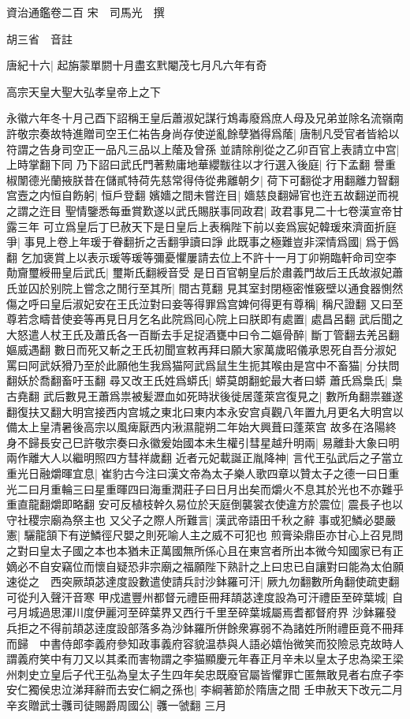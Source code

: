 資治通鑑卷二百
宋　司馬光　撰

胡三省　音註

唐紀十六|{
	起旃蒙單閼十月盡玄黓閹茂七月凡六年有奇}


高宗天皇大聖大弘孝皇帝上之下

永徽六年冬十月己酉下詔稱王皇后蕭淑妃謀行鴆毒廢爲庶人母及兄弟並除名流嶺南許敬宗奏故特進贈司空王仁祐告身尚存使逆亂餘孽猶得爲䕃|{
	唐制凡受官者皆給以符謂之告身司空正一品凡三品以上䕃及曾孫}
並請除削從之乙卯百官上表請立中宫|{
	上時掌翻下同}
乃下詔曰武氏門著勲庸地華纓黻往以才行選入後庭|{
	行下孟翻}
譽重椒闈德光蘭掖朕昔在儲貳特荷先慈常得侍從弗離朝夕|{
	荷下可翻從才用翻離力智翻}
宫壼之内恒自飭躬|{
	恒戶登翻}
嬪嬙之間未嘗迕目|{
	嬙慈良翻婦官也迕五故翻逆而視之謂之迕目}
聖情鑒悉每垂賞歎遂以武氏賜朕事同政君|{
	政君事見二十七卷漢宣帝甘露三年}
可立爲皇后丁巳赦天下是日皇后上表稱陛下前以妾爲宸妃韓瑗來濟面折庭爭|{
	事見上卷上年瑗于眷翻折之舌翻爭讀曰諍}
此既事之極難豈非深情爲國|{
	爲于僞翻}
乞加褒賞上以表示瑗等瑗等彌憂懼屢請去位上不許十一月丁卯朔臨軒命司空李勣齎璽綬冊皇后武氏|{
	璽斯氏翻綬音受}
是日百官朝皇后於肅義門故后王氏故淑妃蕭氏並囚於别院上嘗念之閒行至其所|{
	間古莧翻}
見其室封閉極密惟竅壁以通食器惻然傷之呼曰皇后淑妃安在王氏泣對曰妾等得罪爲宫婢何得更有尊稱|{
	稱尺證翻}
又曰至尊若念疇昔使妾等再見日月乞名此院爲囘心院上曰朕即有處置|{
	處昌呂翻}
武后聞之大怒遣人杖王氏及蕭氏各一百斷去手足捉酒甕中曰令二嫗骨醉|{
	斷丁管翻去羌呂翻嫗威遇翻}
數日而死又斬之王氏初聞宣敕再拜曰願大家萬歲昭儀承恩死自吾分淑妃罵曰阿武妖猾乃至於此願他生我爲猫阿武爲鼠生生扼其喉由是宫中不畜猫|{
	分扶問翻妖於喬翻畜吁玉翻}
尋又改王氏姓爲蟒氏|{
	蟒莫朗翻蛇最大者曰蟒}
蕭氏爲梟氏|{
	梟古堯翻}
武后數見王蕭爲祟被髪瀝血如死時狀後徙居蓬萊宫復見之|{
	數所角翻祟雖遂翻復扶又翻大明宫接西内宫城之東北曰東内本永安宫貞觀八年置九月更名大明宫以備太上皇清暑後高宗以風痺厭西内湫濕龍朔二年始大興葺曰蓬萊宫}
故多在洛陽終身不歸長安己巳許敬宗奏曰永徽爰始國本未生權引彗星越升明兩|{
	易離卦大象曰明兩作離大人以繼明照四方彗祥歲翻}
近者元妃載誕正胤降神|{
	言代王弘武后之子當立}
重光日融爝暉宜息|{
	崔豹古今注曰漢文帝為太子樂人歌四章以贊太子之德一曰日重光二曰月重輪三曰星重暉四曰海重潤莊子曰日月出矣而爝火不息其於光也不亦難乎重直龍翻爝即略翻}
安可反植枝幹久易位於天庭倒襲裳衣使違方於震位|{
	震長子也以守社稷宗廟為祭主也}
又父子之際人所難言|{
	漢武帝語田千秋之辭}
事或犯鱗必嬰嚴憲|{
	驪龍頷下有逆鱗徑尺嬰之則死喻人主之威不可犯也}
煎膏染鼎臣亦甘心上召見問之對曰皇太子國之本也本猶未正萬國無所係心且在東宫者所出本微今知國家已有正嫡必不自安竊位而懷自疑恐非宗廟之福願陛下熟計之上曰忠已自讓對曰能為太伯願速從之　西突厥頡苾達度設數遣使請兵討沙鉢羅可汗|{
	厥九勿翻數所角翻使疏吏翻可從刋入聲汗音寒}
甲戍遣豐州都督元禮臣冊拜頡苾達度設為可汗禮臣至碎葉城|{
	自弓月城過思渾川度伊麗河至碎葉界又西行千里至碎葉城屬焉耆都督府界}
沙鉢羅發兵拒之不得前頡苾逹度設部落多為沙鉢羅所併餘衆寡弱不為諸姓所附禮臣竟不冊拜而歸　中書侍郎李義府參知政事義府容貌温恭與人語必嬉怡微笑而狡險忌克故時人謂義府笑中有刀又以其柔而害物謂之李猫顯慶元年春正月辛未以皇太子忠為梁王梁州刺史立皇后子代王弘為皇太子生四年矣忠既廢官屬皆懼罪亡匿無敢見者右庶子李安仁獨侯忠泣涕拜辭而去安仁綱之孫也|{
	李綱著節於隋唐之間}
壬申赦天下改元二月辛亥贈武士彠司徒賜爵周國公|{
	彠一虢翻}
三月

